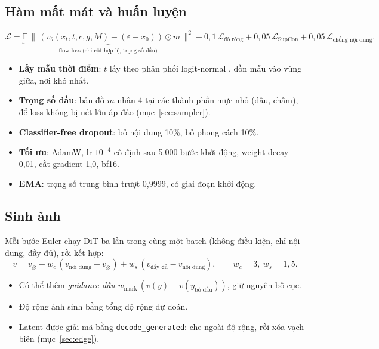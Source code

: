 \documentclass[11pt,a4paper]{article}
\begin{document}
\subsection{Hàm mất mát và huấn luyện}
\begin{equation}
\mathcal L = \underbrace{\mathbb E\,\big\|\,(v_\theta(x_t,t,c,g,M) - (\varepsilon-x_0))\odot m\,\big\|^2}_{\text{flow loss (chỉ cột hợp lệ, trọng số dấu)}} + 0{,}1\,\mathcal L_{\text{độ rộng}} + 0{,}05\,\mathcal L_{\text{SupCon}} + 0{,}05\,\mathcal L_{\text{chống nội dung}} .
\end{equation}
\begin{itemize}
\item \textbf{Lấy mẫu thời điểm}: $t$ lấy theo phân phối logit-normal \cite{esser2024}, dồn mẫu vào vùng giữa, nơi khó nhất.
\item \textbf{Trọng số dấu}: bản đồ $m$ nhân 4 tại các thành phần mực nhỏ (dấu, chấm), để loss không bị nét lớn áp đảo (mục~\ref{sec:sampler}).
\item \textbf{Classifier-free dropout}: bỏ nội dung 10\%, bỏ phong cách 10\%.
\item \textbf{Tối ưu}: AdamW, lr $10^{-4}$ cố định sau 5.000 bước khởi động, weight decay 0,01, cắt gradient 1,0, bf16.
\item \textbf{EMA}: trọng số trung bình trượt 0,9999, có giai đoạn khởi động.
\end{itemize}

\subsection{Sinh ảnh}
\label{sec:sampling}
Mỗi bước Euler chạy DiT ba lần trong cùng một batch (không điều kiện, chỉ nội dung, đầy đủ), rồi kết hợp:
\begin{equation}
v = v_\varnothing + w_c\,(v_{\text{nội dung}} - v_\varnothing) + w_s\,(v_{\text{đầy đủ}} - v_{\text{nội dung}}),\qquad w_c=3,\ w_s=1{,}5 .
\end{equation}
\begin{itemize}
\item Có thể thêm \emph{guidance dấu} $w_\text{mark}\,(v(y) - v(y_{\text{bỏ dấu}}))$, giữ nguyên bố cục.
\item Độ rộng ảnh sinh bằng tổng độ rộng dự đoán.
\item Latent được giải mã bằng \texttt{decode\_generated}: che ngoài độ rộng, rồi xóa vạch biên (mục~\ref{sec:edge}).
\end{itemize}

\end{document}
